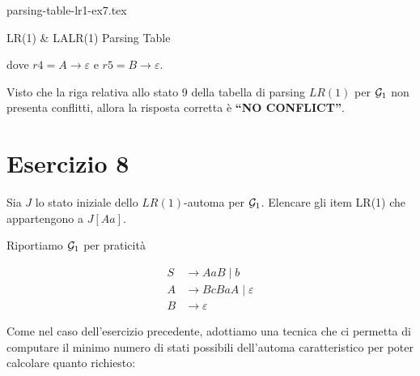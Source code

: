 \documentclass[class=book, crop=false, oneside, 12pt]{standalone}
\begin{document}
\begin{table}[H]
    \centering
    {parsing-table-lr1-ex7.tex}
    \caption{LR(1) \& LALR(1) Parsing Table}
    \label{tab:parsing-table-lr1-ex7}
\end{table}
dove \(r4 =  A \to \varepsilon\) e \(r5 =  B \to \varepsilon\).

Visto che la riga relativa allo stato 9 della tabella di parsing \(LR(1)\) per \(\mathcal{G}_1\) non presenta conflitti, allora la risposta corretta è \textbf{“NO CONFLICT”}.

\section*{Esercizio 8}

Sia \(J\) lo stato iniziale dello \(LR(1)\)-automa per \(\mathcal{G}_1\). Elencare gli item LR(1) che appartengono a \(J[Aa]\).

Riportiamo \(\mathcal{G}_1\) per praticità

\begin{align*}
    S &\to AaB \mid b \\
    A &\to BcBaA \mid \varepsilon \\
    B &\to \varepsilon
\end{align*}

Come nel caso dell'esercizio precedente, adottiamo una tecnica che ci permetta di computare il minimo numero di stati possibili dell'automa caratteristico per poter calcolare quanto richiesto:
\end{document}
